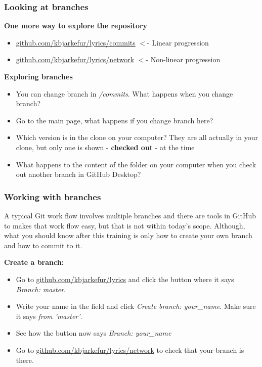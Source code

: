 \documentclass[aspectratio=169]{beamer} %
\newcommand{\trainingURL}[1]{{\color{blue}\url{#1}}}
\newcommand{\traininerUsername}{kbjarkefur}
\newcommand{\repoName}{\traininerUsername/lyrics}
\newcommand{\trainingRepoURL}[1]{\trainingURL{github.com/\repoName #1}}
\begin{document}
\begin{frame}
\frametitle{Looking at branches}


	\textbf{One more way to explore the repository}
	\begin{itemize}
		\item \trainingRepoURL{/commits} $<$- Linear progression
		\item \trainingRepoURL{/network} $<$- Non-linear progression
	\end{itemize}

	\vspace{.1cm}

	\textbf{Exploring branches}
	\begin{itemize}
		\item You can change branch in \textit{/commits}. What happens when you change branch?
		\item Go to the main page, what happens if you change branch here?
		\item Which version is in the clone on your computer? They are all actually in your clone, but only one is shown - \textbf{checked out} - at the time
		\item What happens to the content of the folder on your computer when you check out another branch in GitHub Desktop?
	\end{itemize}

\end{frame}

\begin{frame}
\frametitle{Working with branches}

	A typical Git work flow involves multiple branches and there are tools in GitHub to makes that work flow easy, but that is not within today's scope. Although, what you should know after this training is only how to create your own branch and how to commit to it.

	\textbf{Create a branch:}
	\begin{itemize}
		\item Go to \trainingRepoURL{} and click the button where it says \textit{Branch: master}.
		\item Write your name in the field and click \textit{Create branch: your\_name}. Make sure it says \textit{from 'master'}.
		\item See how the button now says \textit{Branch: your\_name}
		\item Go to \trainingRepoURL{/network} to check that your branch is there.
	\end{itemize}

\end{frame}
\end{document}
